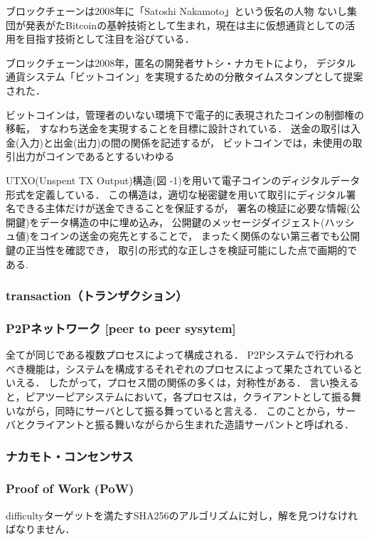 \documentclass[a4paper,12pt]{jsarticle}
\begin{document}
ブロックチェーンは2008年に「Satoshi Nakamoto」という仮名の人物
ないし集団が発表がたBitcoinの基幹技術として生まれ，現在は主に仮想通貨としての活用を目指す技術として注目を浴びている．

ブロックチェーンは2008年，匿名の開発者サトシ・ナカモトにより，
デジタル通貨システム「ビットコイン」を実現するための分散タイムスタンプとして提案された．

ビットコインは，管理者のいない環境下で電子的に表現されたコインの制御権の移転，
すなわち送金を実現することを目標に設計されている．
送金の取引は入金(入力)と出金(出力)の間の関係を記述するが，
ビットコインでは，未使用の取引出力がコインであるとするいわゆる

UTXO(Unspent TX Output)構造(図 -1)を用いて電子コインのディジタルデータ形式を定義している．
この構造は，適切な秘密鍵を用いて取引にディジタル署名できる主体だけが送金できることを保証するが，
署名の検証に必要な情報(公開鍵)をデータ構造の中に埋め込み，
公開鍵のメッセージダイジェスト(ハッシュ値)をコインの送金の宛先とすることで，
まったく関係のない第三者でも公開鍵の正当性を確認でき，
取引の形式的な正しさを検証可能にした点で画期的である.

      \subsubsection{transaction（トランザクション）}

      \subsubsection{P2Pネットワーク [peer to peer sysytem]}
全てが同じである複数プロセスによって構成される．
P2Pシステムで行われるべき機能は，システムを構成するそれぞれのプロセスによって果たされているといえる．
したがって，プロセス間の関係の多くは，対称性がある．
言い換えると，ピアツーピアシステムにおいて，各プロセスは，クライアントとして振る舞いながら，同時にサーバとして振る舞っていると言える．
このことから，サーバとクライアントと振る舞いながらから生まれた造語サーバントと呼ばれる．

      \subsubsection{ナカモト・コンセンサス}


      \subsubsection{Proof of Work (PoW)}
difficultyターゲットを満たすSHA256のアルゴリズムに対し，解を見つけなければなりません．
\end{document}
